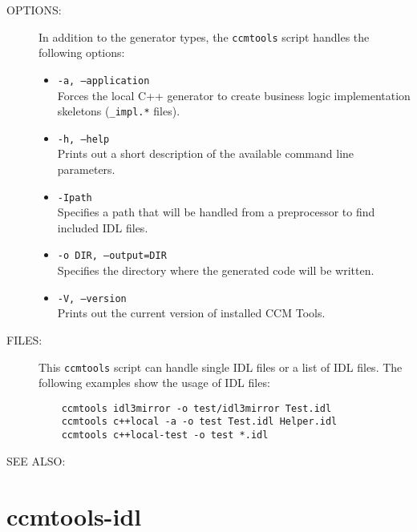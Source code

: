 \begin{description}
\item [OPTIONS:]
  In addition to the generator types, the {\tt ccmtools} script handles
  the following options:
  \begin{itemize}
  \item {\tt -a, --application} \\
    Forces the local C++ generator to create business logic
    implementation skeletons ({\tt *\_impl.*} files).

  \item {\tt -h, --help} \\
    Prints out a short description of the available command line parameters.

  \item {\tt -Ipath} \\
    Specifies a path that will be handled from a preprocessor to find 
    included IDL files.

  \item {\tt -o DIR, --output=DIR} \\
    Specifies the directory where the generated code will be written. 

  \item {\tt -V, --version} \\
    Prints out the current version of installed CCM Tools.
  \end{itemize}
  
\item [FILES:]
  This {\tt ccmtools} script can handle single IDL files or a list of IDL
  files. The following examples show the usage of IDL files: 
  \begin{verbatim}
    ccmtools idl3mirror -o test/idl3mirror Test.idl
    ccmtools c++local -a -o test Test.idl Helper.idl 
    ccmtools c++local-test -o test *.idl
  \end{verbatim}
\item [SEE ALSO:]
\end{description}



\newpage
\section{ccmtools-idl}


